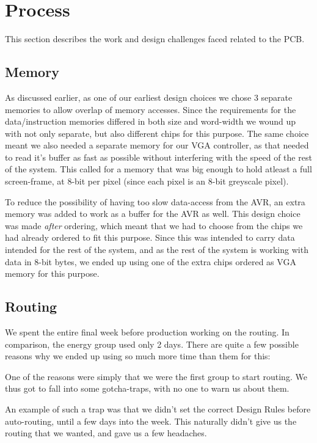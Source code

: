 \section {Process}
This section describes the work and design challenges faced related to the PCB.
\subsection{Memory}
As discussed earlier, as one of our earliest design choices we chose 3 separate memories to allow overlap of
memory accesses. Since the requirements for the data/instruction memories differed in both size and word-width 
we wound up with not only separate, but also different chips for this purpose. The same choice meant we also
needed a separate memory for our \ac{VGA} controller, as that needed to read it's buffer as fast as possible
without interfering with the speed of the rest of the system. This called for a memory that was big enough to
hold atleast a full screen-frame, at 8-bit per pixel (since each pixel is an 8-bit greyscale pixel).

To reduce the possibility of having too slow data-access from the AVR, an extra memory was added to work as
a buffer for the AVR as well. This design choice was made {\em after} ordering, which meant that we had to choose from
the chips we had already ordered to fit this purpose. Since this was intended to carry data intended for the rest
of the system, and as the rest of the system is working with data in 8-bit bytes, we ended up using one of the
extra chips ordered as \ac{VGA} memory for this purpose.



\subsection {Routing}

We spent the entire final week before production working on the routing. In comparison, the energy group used only 2 days. There are quite a few possible reasons why we ended up using so much more time than them for this:

One of the reasons were simply that we were the first group to start routing. We thus got to fall into some gotcha-traps, with no one to warn us about them.

An example of such a trap was that we didn't set the correct Design Rules before auto-routing, until a few days into the week. This naturally didn't give us the routing that we wanted, and gave us a few headaches.

